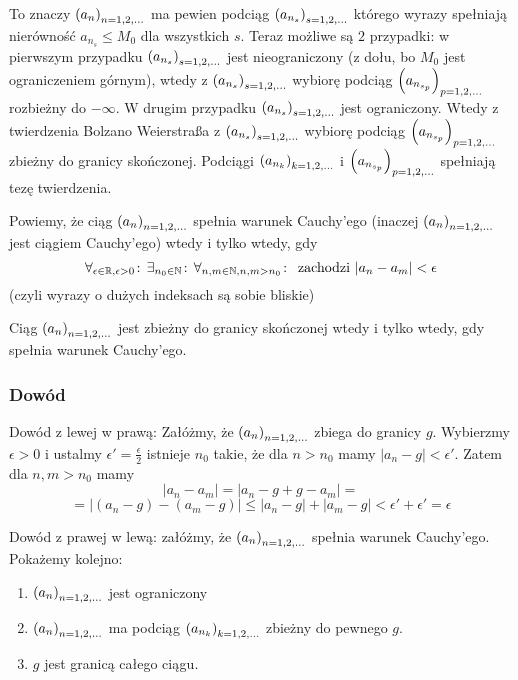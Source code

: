 \documentclass[9pt]{article}
\begin{document}
To znaczy $\left(a_n\right)_{n = 1,2,...}$ ma pewien podciąg $\left(a_{n_s}\right)_{s = 1,2,...}$ którego wyrazy spełniają nierówność
$a_{n_s} \le M_0$ dla wszystkich $s$. Teraz możliwe są $2$ przypadki: w pierwszym przypadku
$\left(a_{n_s}\right)_{s = 1,2,...}$ jest nieograniczony (z dołu, bo $M_0$ jest ograniczeniem górnym), wtedy z
$\left(a_{n_s}\right)_{s = 1,2,...}$ wybiorę podciąg $\left(a_{n_{s_p}}\right)_{p = 1,2,...}$ rozbieżny do $-\infty$. W drugim
przypadku $\left(a_{n_s}\right)_{s = 1,2,...}$ jest ograniczony. Wtedy z twierdzenia Bolzano Weierstraßa z
$\left(a_{n_s}\right)_{s = 1,2,...}$ wybiorę podciąg $\left(a_{n_{s_{p}}}\right)_{p = 1,2,...}$ zbieżny do granicy skończonej.
Podciągi $\left(a_{n_k}\right)_{k = 1,2,...}$ i $\left(a_{n_{s_p}}\right)_{p = 1,2,...}$ spełniają tezę twierdzenia.

\begin{Def}
    Powiemy, że ciąg $\left(a_n\right)_{n = 1,2,...}$ spełnia warunek Cauchy'ego (inaczej $\left(a_n\right)_{n = 1,2,...}$ jest ciągiem
    Cauchy'ego) wtedy i tylko wtedy, gdy
    \[
        \forall_{\epsilon \in \mathbb{R}, \epsilon > 0} \! : \, \exists_{n_0 \in \mathbb{N}} \! : \, \forall_{n, m \in \mathbb{N}, n,m > n_0} \! : \, \text{
        zachodzi } |a_n - a_m| < \epsilon
    \]
    (czyli wyrazy o dużych indeksach są sobie bliskie)
\end{Def}

\begin{Twi}
    Ciąg $\left(a_n\right)_{n = 1,2,...}$ jest zbieżny do granicy skończonej wtedy i tylko wtedy, gdy spełnia warunek
    Cauchy'ego.
\end{Twi}

\subsubsection*{Dowód}
Dowód z lewej w prawą: Załóżmy, że $\left(a_n\right)_{n = 1,2,...}$ zbiega do granicy $g$. Wybierzmy $\epsilon > 0$ i
ustalmy $\epsilon' = \frac{\epsilon}{2}$ istnieje $n_0$ takie, że dla $n > n_0$ mamy $|a_n - g| <
\epsilon'$. Zatem dla $n, m > n_0$ mamy
\[
    |a_n - a_m| = |a_n - g + g - a_m| = 
\]
\[
    = |(a_n - g) - (a_m - g)| \le |a_n - g| + |a_m - g| < \epsilon' + \epsilon' = \epsilon
\]

Dowód z prawej w lewą: załóżmy, że $\left(a_n\right)_{n = 1,2,...}$ spełnia warunek Cauchy'ego. Pokażemy kolejno:

\begin{enumerate}
    \item $\left(a_n\right)_{n = 1,2,...}$ jest ograniczony
    \item $\left(a_n\right)_{n = 1,2,...}$ ma podciąg $\left(a_{n_k}\right)_{k = 1,2,...}$ zbieżny do pewnego $g$.
    \item $g$ jest granicą całego ciągu.
\end{enumerate}
\end{document}
